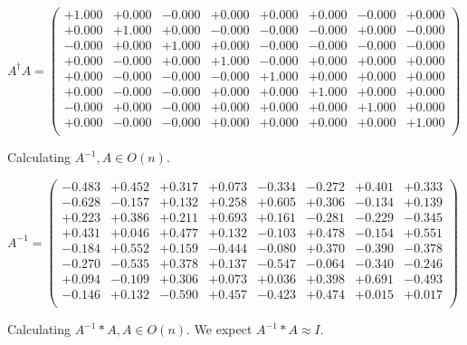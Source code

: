 \documentclass[9pt]{article}
\theoremstyle{plain}
\theoremstyle{definition}
\theoremstyle{remark}
\numberwithin{equation}{section}
\begin{document}
$A^{\dag} A = \left(
\begin{array}{
cccccccc}
+1.000 & +0.000 & -0.000 & +0.000 & +0.000 & +0.000 & -0.000 & +0.000 \\
+0.000 & +1.000 & +0.000 & -0.000 & -0.000 & -0.000 & +0.000 & -0.000 \\
-0.000 & +0.000 & +1.000 & +0.000 & -0.000 & -0.000 & -0.000 & -0.000 \\
+0.000 & -0.000 & +0.000 & +1.000 & -0.000 & +0.000 & +0.000 & +0.000 \\
+0.000 & -0.000 & -0.000 & -0.000 & +1.000 & +0.000 & +0.000 & +0.000 \\
+0.000 & -0.000 & -0.000 & +0.000 & +0.000 & +1.000 & +0.000 & +0.000 \\
-0.000 & +0.000 & -0.000 & +0.000 & +0.000 & +0.000 & +1.000 & +0.000 \\
+0.000 & -0.000 & -0.000 & +0.000 & +0.000 & +0.000 & +0.000 & +1.000 \\
\end{array}
\right)$ \newline 

Calculating $A^{-1} ,  A \in O(n)$.

$A^{-1} = \left(
\begin{array}{
cccccccc}
-0.483 & +0.452 & +0.317 & +0.073 & -0.334 & -0.272 & +0.401 & +0.333 \\
-0.628 & -0.157 & +0.132 & +0.258 & +0.605 & +0.306 & -0.134 & +0.139 \\
+0.223 & +0.386 & +0.211 & +0.693 & +0.161 & -0.281 & -0.229 & -0.345 \\
+0.431 & +0.046 & +0.477 & +0.132 & -0.103 & +0.478 & -0.154 & +0.551 \\
-0.184 & +0.552 & +0.159 & -0.444 & -0.080 & +0.370 & -0.390 & -0.378 \\
-0.270 & -0.535 & +0.378 & +0.137 & -0.547 & -0.064 & -0.340 & -0.246 \\
+0.094 & -0.109 & +0.306 & +0.073 & +0.036 & +0.398 & +0.691 & -0.493 \\
-0.146 & +0.132 & -0.590 & +0.457 & -0.423 & +0.474 & +0.015 & +0.017 \\
\end{array}
\right)$ \newline 

Calculating $A^{-1} *A  ,  A \in O(n)$.   We expect $A^{-1} *A  \approx I$. 
\end{document}
